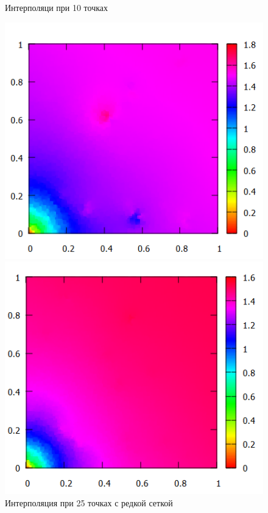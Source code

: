 \documentclass[14pt, a4paper]{extarticle}
\begin{document}
\begin{enumerate}
\begin{figure}[H]
\begin{minipage}{0.5\textwidth}
					\caption[.] {Интерполяци при 10 точках}
				\end{minipage}\hfill
			\end{figure}
			\begin{figure}[H]
				\begin{minipage}{0.5\textwidth}
					\centering
					\includegraphics[width = \linewidth]{../2func/M=25T=3718Err=0.0168654.png}
					\caption[.] {Интерполяция при 25 точках с редкой сеткой}
				\end{minipage}\hfill
				\begin{minipage}{0.5\textwidth}
					\centering
					\includegraphics[width = \linewidth]{../2func/M=25T=5774Err=0.0170492.png}

\end{minipage}
\end{figure}
\end{enumerate}
\end{document}
